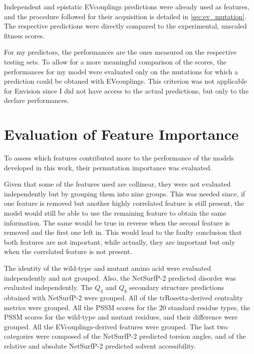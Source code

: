Independent and epistatic EVcouplings predictions were already used as features, and the procedure followed for their acquisition is detailed in \cref{sec:ev_mutation}.
The respective predictions were directly compared to the experimental, unscaled fitness scores.

For my predictors, the performances are the ones measured on the respective testing sets.
To allow for a more meaningful comparison of the scores, the performances for my model were evaluated only on the mutations for which a prediction could be obtaned with EVcouplings.
This criterion was not applicable for Envision since I did not have access to the actual predictions, but only to the declare performances.

\section{Evaluation of Feature Importance}\label{sec:mm_feature_importance}
To assess which features contributed more to the performance of the models developed in this work, their permutation importance was evaluated.

Given that some of the features used are collinear, they were not evaluated independently but by grouping them into nine groups.
This was needed since, if one feature is removed but another highly correlated feature is still present, the model would still be able to use the remaining feature to obtain the same information.
The same would be true in reverse when the second feature is removed and the first one left in.
This would lead to the faulty conclusion that both features are not important, while actually, they are important but only when the correlated feature is not present.

The identity of the wild-type and mutant amino acid were evaluated independently and not grouped.
Also, the NetSurfP-2 predicted disorder was evaluated independently.
The $Q_3$ and $Q_8$ secondary structure predictions obtained with NetSurfP-2 were grouped.
All of the trRosetta-derived centrality metrics were grouped.
All the PSSM scores for the \num{20} standard residue types, the PSSM scores for the wild-type and mutant residues, and their difference were grouped.
All the EVcouplings-derived features were grouped.
The last two categories were composed of the NetSurfP-2 predicted torsion angles, and of the relative and absolute NetSurfP-2 predicted solvent accessibility.

